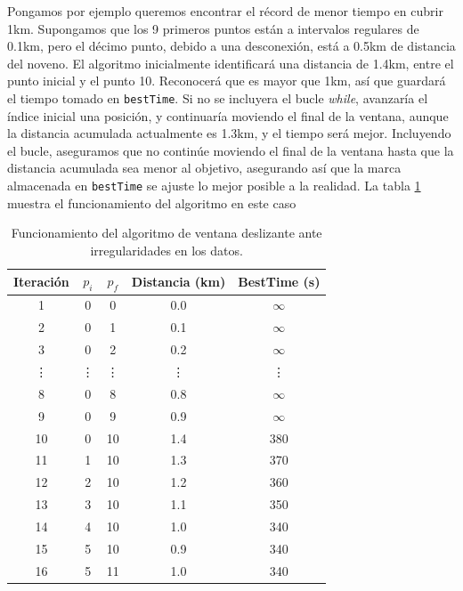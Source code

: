 Pongamos por ejemplo queremos encontrar el récord de menor tiempo en cubrir 1km. Supongamos que los 9 primeros puntos están a intervalos regulares de 0.1km, pero el décimo punto, debido a una desconexión, está a 0.5km de distancia del noveno. El algoritmo inicialmente identificará una distancia de 1.4km, entre el punto inicial y el punto 10. Reconocerá que es mayor que 1km, así que guardará el tiempo tomado en \texttt{bestTime}. Si no se incluyera el bucle \textit{while}, avanzaría el índice inicial una posición, y continuaría moviendo el final de la ventana, aunque la distancia acumulada actualmente es 1.3km, y el tiempo será mejor. Incluyendo el bucle, aseguramos que no continúe moviendo el final de la ventana hasta que la distancia acumulada sea menor al objetivo, asegurando así que la marca almacenada en \texttt{bestTime} se ajuste lo mejor posible a la realidad. La tabla \ref{tab:sliding_window} muestra el funcionamiento del algoritmo en este caso
\begin{table}[h!]
    \centering
    \begin{tabular}{|c|c|c|c|c|}
        \hline
        Iteración & $p_i$ & $p_f$ & Distancia (km) & BestTime (s) \\ \hline
        1  & 0 & 0  & 0.0  & $\infty$ \\ \hline
        2  & 0 & 1  & 0.1  & $\infty$ \\ \hline
        3  & 0 & 2  & 0.2  & $\infty$ \\ \hline
        \vdots & \vdots & \vdots & \vdots & \vdots \\ \hline
        8  & 0 & 8  & 0.8  & $\infty$ \\ \hline
        9  & 0 & 9  & 0.9  & $\infty$ \\ \hline
        10 & 0 & 10 & 1.4  & 380 \\ \hline
        11 & 1 & 10 & 1.3  & 370 \\ \hline
        12 & 2 & 10 & 1.2  & 360 \\ \hline
        13 & 3 & 10 & 1.1  & 350 \\ \hline
        14 & 4 & 10 & 1.0  & 340 \\ \hline
        15 & 5 & 10 & 0.9  & 340 \\ \hline
        16 & 5 & 11 & 1.0  & 340 \\ \hline
        \end{tabular}
        \caption{Funcionamiento del algoritmo de ventana deslizante ante irregularidades en los datos.}
        \label{tab:sliding_window}
\end{table}

